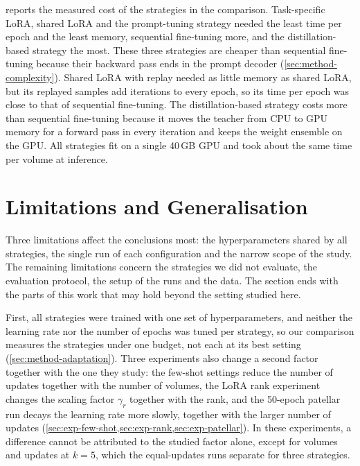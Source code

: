  reports the measured cost of the strategies in the comparison.
Task-specific LoRA, shared LoRA and the prompt-tuning strategy needed the least time per epoch and the least memory, sequential fine-tuning more, and the distillation-based strategy the most.
These three strategies are cheaper than sequential fine-tuning because their backward pass ends in the prompt decoder (\cref{sec:method-complexity}).
Shared LoRA with replay needed as little memory as shared LoRA, but its replayed samples add iterations to every epoch, so its time per epoch was close to that of sequential fine-tuning.
The distillation-based strategy costs more than sequential fine-tuning because it moves the teacher from CPU to GPU memory for a forward pass in every iteration and keeps the weight ensemble on the GPU.
All strategies fit on a single 40\,GB GPU and took about the same time per volume at inference.

\section{Limitations and Generalisation}
\label{sec:exp-limitations}

Three limitations affect the conclusions most: the hyperparameters shared by all strategies, the single run of each configuration and the narrow scope of the study.
The remaining limitations concern the strategies we did not evaluate, the evaluation protocol, the setup of the runs and the data.
The section ends with the parts of this work that may hold beyond the setting studied here.

First, all strategies were trained with one set of hyperparameters, and neither the learning rate nor the number of epochs was tuned per strategy, so our comparison measures the strategies under one budget, not each at its best setting (\cref{sec:method-adaptation}).
Three experiments also change a second factor together with the one they study: the few-shot settings reduce the number of updates together with the number of volumes, the LoRA rank experiment changes the scaling factor $\gamma_r$ together with the rank, and the 50-epoch patellar run decays the learning rate more slowly, together with the larger number of updates (\cref{sec:exp-few-shot,sec:exp-rank,sec:exp-patellar}).
In these experiments, a difference cannot be attributed to the studied factor alone, except for volumes and updates at $k = 5$, which the equal-updates runs separate for three strategies.

